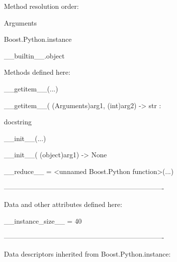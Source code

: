 \documentclass[letterpaper,10pt,english]{sphinxmanual}
\begin{document}
\begin{description}
\begin{description}
\item[{class Arguments(Boost.Python.instance)}] \leavevmode
\begin{DUlineblock}{0em}
\item[] Method resolution order:
\item[]
\begin{DUlineblock}{\DUlineblockindent}
\item[] Arguments
\item[] Boost.Python.instance
\item[] \_\_builtin\_\_.object
\item[] 
\end{DUlineblock}
\item[] Methods defined here:
\item[] 
\item[] \_\_getitem\_\_(...)
\item[]
\begin{DUlineblock}{\DUlineblockindent}
\item[] \_\_getitem\_\_( (Arguments)arg1, (int)arg2) -\textgreater{} str :
\item[]
\begin{DUlineblock}{\DUlineblockindent}
\item[] docstring
\item[] 
\end{DUlineblock}
\end{DUlineblock}
\item[] \_\_init\_\_(...)
\item[]
\begin{DUlineblock}{\DUlineblockindent}
\item[] \_\_init\_\_( (object)arg1) -\textgreater{} None
\item[] 
\end{DUlineblock}
\item[] \_\_reduce\_\_ = \textless{}unnamed Boost.Python function\textgreater{}(...)
\item[] 
\item[] ----------------------------------------------------------------------
\item[] Data and other attributes defined here:
\item[] 
\item[] \_\_instance\_size\_\_ = 40
\item[] 
\item[] ----------------------------------------------------------------------
\item[] Data descriptors inherited from Boost.Python.instance:

\end{DUlineblock}
\end{description}
\end{description}
\end{document}
